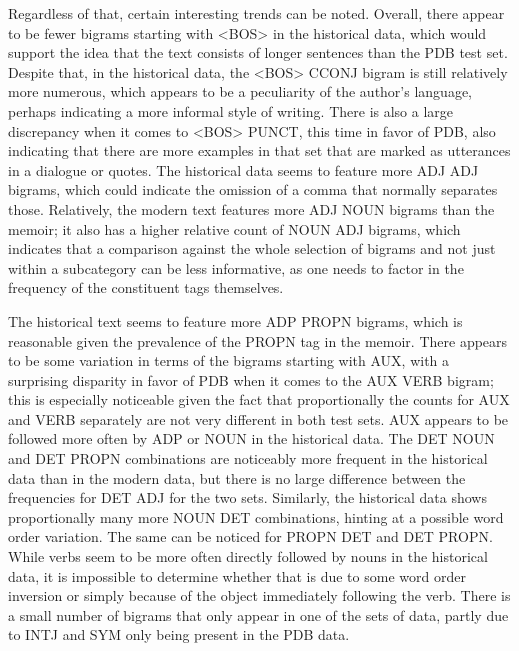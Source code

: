 Regardless of that, certain interesting trends can be noted. Overall, there appear to be fewer bigrams starting with <BOS> in the historical data, which would support the idea that the text consists of longer sentences than the PDB test set. Despite that, in the historical data, the <BOS> CCONJ bigram is still relatively more numerous, which appears to be a peculiarity of the author's language, perhaps indicating a more informal style of writing. There is also a large discrepancy when it comes to <BOS> PUNCT, this time in favor of PDB, also indicating that there are more examples in that set that are marked as utterances in a dialogue or quotes. The historical data seems to feature more ADJ ADJ bigrams, which could indicate the omission of a comma that normally separates those. Relatively, the modern text features more ADJ NOUN bigrams than the memoir; it also has a higher relative count of NOUN ADJ bigrams, which indicates that a comparison against the whole selection of bigrams and not just within a subcategory can be less informative, as one needs to factor in the frequency of the constituent tags themselves. 

The historical text seems to feature more ADP PROPN bigrams, which is reasonable given the prevalence of the PROPN tag in the memoir. There appears to be some variation in terms of the bigrams starting with AUX, with a surprising disparity in favor of PDB when it comes to the AUX VERB bigram; this is especially noticeable given the fact that proportionally the counts for AUX and VERB separately are not very different in both test sets. AUX appears to be followed more often by ADP or NOUN in the historical data. The DET NOUN and DET PROPN combinations are noticeably more frequent in the historical data than in the modern data, but there is no large difference between the frequencies for DET ADJ for the two sets. Similarly, the historical data shows proportionally many more NOUN DET combinations, hinting at a possible word order variation. The same can be noticed for PROPN DET and DET PROPN. While verbs seem to be more often directly followed by nouns in the historical data, it is impossible to determine whether that is due to some word order inversion or simply because of the object immediately following the verb. There is a small number of bigrams that only appear in one of the sets of data, partly due to INTJ and SYM only being present in the PDB data.


